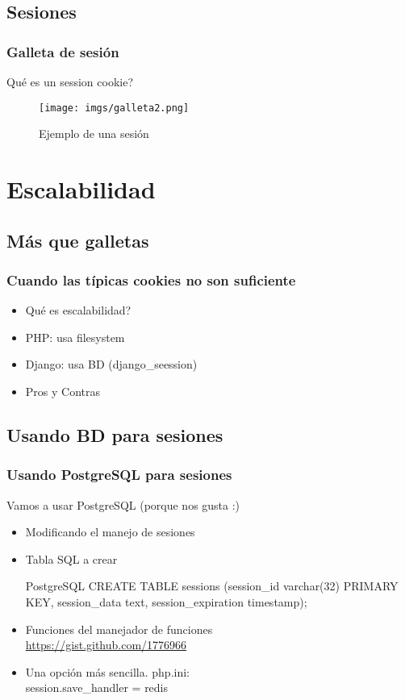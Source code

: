 \documentclass{beamer}
\begin{document}
\subsection{Sesiones}
\begin{frame}\frametitle{Galleta de sesión}
Qué es un session cookie?
\begin{figure}
\texttt{[image: imgs/galleta2.png]}
\caption{Ejemplo de una sesión}
\end{figure}
\end{frame}

\section{Escalabilidad} 
\subsection{Más que galletas} 
\begin{frame}\frametitle{Cuando las típicas cookies no son suficiente}
\begin{itemize}
\item Qué es escalabilidad? \pause
\item PHP: usa filesystem \pause
\item Django: usa BD (django\_seession) \pause
\item Pros y Contras
\end{itemize}
\end{frame}

\subsection{Usando BD para sesiones} 
\begin{frame}\frametitle{Usando PostgreSQL para sesiones}
Vamos a usar PostgreSQL (porque nos gusta :)
\begin{itemize}
\item Modificando el manejo de sesiones \pause
\item Tabla SQL a crear \\
\begin{block}{PostgreSQL}
CREATE TABLE sessions (session\_id varchar(32) PRIMARY KEY, session\_data text, session\_expiration timestamp);
\end{block}
\pause
\item Funciones del manejador de funciones \\
\url{https://gist.github.com/1776966} \pause
\item Una opción más sencilla. php.ini: \\
session.save\_handler = redis
\end{itemize} 
\end{frame}
\end{document}
